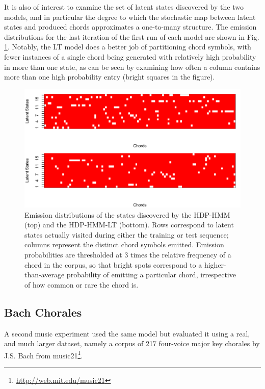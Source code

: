 It is also of interest to examine the set of latent states discovered
by the two models, and in particular the degree to which the
stochastic map between latent states and produced chords approximates
a one-to-many structure.  The emission distributions for the last
iteration of the first run of each model are shown in
Fig. \ref{fig:music-emissions}.  Notably, the LT model does a better
job of partitioning chord symbols, with fewer instances of a single
chord being generated with relatively high probability in more than
one state, as can be seen by examining how often a column contains
more than one high probability entry (bright squares in the figure).

\begin{figure}[t]
  \centering
  \includegraphics[width=\textwidth]{fig/music/chord1/chord_emissions.pdf}
  \caption{Emission distributions of the states discovered by the
    HDP-HMM (top) and the HDP-HMM-LT (bottom). Rows correspond to
    latent states actually visited during either the training or test
    sequence; columns represent the distinct chord symbols emitted.
    Emission probabilities are thresholded at 3 times the relative
    frequency of a chord in the corpus, so that bright spots
    correspond to a higher-than-average probability of emitting a
    particular chord, irrespective of how common or rare the chord is.
    \label{fig:music-emissions}}
\end{figure}

\subsection{Bach Chorales}

A second music experiment used the same model but evaluated it using 
a real, and much larger dataset, namely a corpus of 217 four-voice
major key chorales by J.S. Bach from
music21\footnote{\url{http://web.mit.edu/music21}}.

